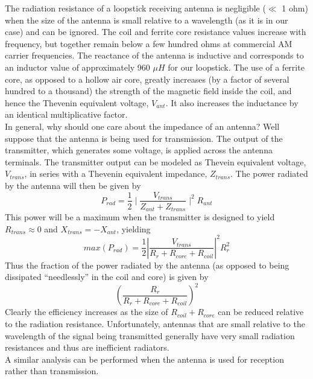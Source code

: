 \documentclass{article}
\begin{document}
The radiation resistance of a loopstick receiving antenna is negligible ($\ll$ 1 ohm) when the size of the antenna is small relative to a wavelength (as it is in our case) and can be ignored. The coil and ferrite core resistance values increase with frequency, but together remain below a few hundred ohms at commercial AM carrier frequencies. The reactance of the antenna is inductive and corresponds to an inductor value of approximately 960 $\mu H$ for our loopstick. The use of a ferrite core, as opposed to a hollow air core, greatly increases (by a factor of several hundred to a thousand) the strength of the magnetic field inside the coil, and hence the Thevenin equivalent voltage, $V_{ant}$. It also increases the inductance by an identical multiplicative factor.\\
In general, why should one care about the impedance of an antenna? Well suppose that the antenna is being used for transmission. The output of the transmitter, which generates some voltage, is applied across the antenna terminals. The transmitter output can be modeled as Thevein equivalent voltage, $V_{trans}$, in series with a Thevenin equivalent impedance, $Z_{trans}$. The power radiated by the antenna will then be given by
$$ P_{rad} = \frac{1}{2}\mid\frac{V_{trans}}{Z_{ant}+Z_{trans}}\mid^2 R_{ant} $$
This power will be a maximum when the transmitter is designed to yield $R_{trans} \approx 0$ and $X_{trans} = - X_{ant}$, yielding
$$ max(P_{rad}) = \frac{1}{2}|\frac{V_{trans}}{R_r+R_{core}+R_{coil}}|^2R_r^2$$
Thus the fraction of the power radiated by the antenna (as opposed to being dissipated “needlessly” in the coil and core) is given by
$$(\frac{R_r}{R_r+R_{core}+R_{coil}})^2$$
Clearly the efficiency increases as the size of $R_{coil} + R_{core}$ can be reduced relative to the radiation resistance. Unfortunately, antennas that are small relative to the wavelength of the signal being transmitted generally have very small radiation resistances and thus are inefficient radiators.\\
A similar analysis can be performed when the antenna is used for reception rather than transmission.
\end{document}
